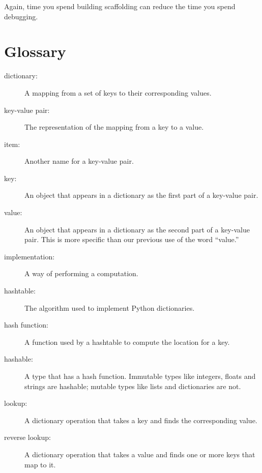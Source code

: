 \documentclass[10pt]{book}
\begin{document}
Again, time you spend building scaffolding can reduce
the time you spend debugging.


\section{Glossary}

\begin{description}

\item[dictionary:] A mapping from a set of keys to their
corresponding values.

\item[key-value pair:] The representation of the mapping from
a key to a value.

\item[item:] Another name for a key-value pair.

\item[key:] An object that appears in a dictionary as the
first part of a key-value pair.

\item[value:] An object that appears in a dictionary as the
second part of a key-value pair.  This is more specific than
our previous use of the word ``value.''

\item[implementation:] A way of performing a computation.

\item[hashtable:] The algorithm used to implement Python
dictionaries.

\item[hash function:] A function used by a hashtable to compute the
location for a key.

\item[hashable:] A type that has a hash function.  Immutable
types like integers,
floats and strings are hashable; mutable types like lists and
dictionaries are not.

\item[lookup:] A dictionary operation that takes a key and finds
the corresponding value.

\item[reverse lookup:] A dictionary operation that takes a value and finds
one or more keys that map to it.


\end{description}
\end{document}

